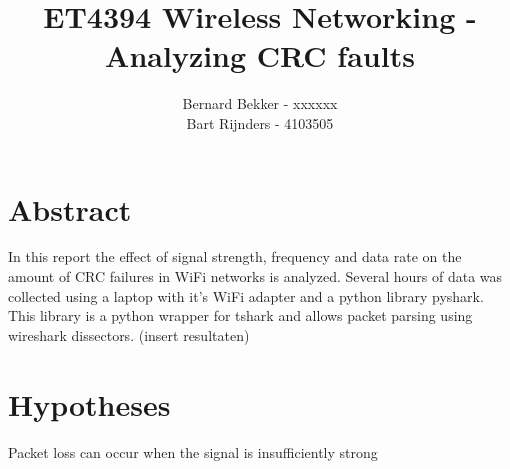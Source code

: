 \documentclass{article}
\title{ET4394 Wireless Networking - Analyzing CRC faults}
\date{}
\author{
Bernard Bekker - xxxxxx \\
Bart Rijnders - 4103505
}
\begin{document}
\maketitle

\section{Abstract}

In this report the effect of signal strength, frequency and data rate on the amount of CRC failures in WiFi networks is analyzed. Several hours of data was collected using a laptop with it's WiFi adapter and a python library pyshark. This library is a python wrapper for tshark and allows packet parsing using wireshark dissectors. (insert resultaten)


\section{Hypotheses}

Packet loss can occur when the signal is insufficiently strong


\printbibliography
\end{document}
